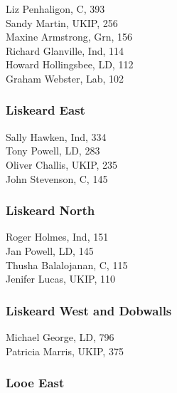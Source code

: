 \documentclass[a4paper,openany,10pt]{book}
\begin{document}


Liz Penhaligon, C, 393\\
Sandy Martin, UKIP, 256\\
Maxine Armstrong, Grn, 156\\
Richard Glanville, Ind, 114\\
Howard Hollingsbee, LD, 112\\
Graham Webster, Lab, 102\\


\subsubsection*{Liskeard East}



Sally Hawken, Ind, 334\\
Tony Powell, LD, 283\\
Oliver Challis, UKIP, 235\\
John Stevenson, C, 145\\


\subsubsection*{Liskeard North}



Roger Holmes, Ind, 151\\
Jan Powell, LD, 145\\
Thusha Balalojanan, C, 115\\
Jenifer Lucas, UKIP, 110\\


\subsubsection*{Liskeard West and Dobwalls}



Michael George, LD, 796\\
Patricia Marris, UKIP, 375\\


\subsubsection*{Looe East}
\end{document}
